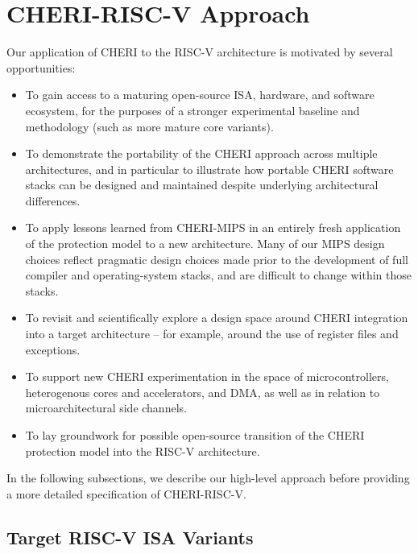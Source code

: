 \section{CHERI-RISC-V Approach}

Our application of CHERI to the RISC-V architecture is motivated by several
opportunities:

\begin{itemize}
\item To gain access to a maturing open-source ISA, hardware, and software
  ecosystem, for the purposes of a stronger experimental baseline and
  methodology (such as more mature core variants).

\item To demonstrate the portability of the CHERI approach across multiple
  architectures, and in particular to illustrate how portable CHERI software
  stacks can be designed and maintained despite underlying architectural
  differences.

\item To apply lessons learned from CHERI-MIPS in an entirely fresh
  application of the protection model to a new architecture.
  Many of our MIPS design choices reflect pragmatic design choices made prior
  to the development of full compiler and operating-system stacks, and are
  difficult to change within those stacks.

\item To revisit and scientifically explore a design space around CHERI
  integration into a target architecture -- for example, around the use of
  register files and exceptions.

\item To support new CHERI experimentation in the space of microcontrollers,
  heterogenous cores and accelerators, and DMA, as well as in relation to
  microarchitectural side channels.

\item To lay groundwork for possible open-source transition of the CHERI
  protection model into the RISC-V architecture.
\end{itemize}

In the following subsections, we describe our high-level approach before
providing a more detailed specification of CHERI-RISC-V.

\subsection{Target RISC-V ISA Variants}


